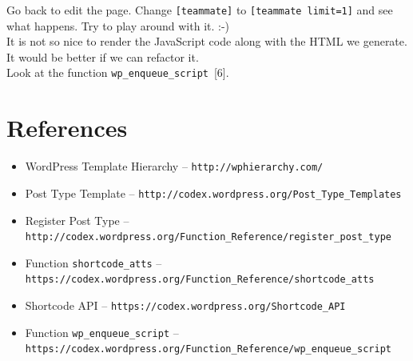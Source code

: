 \documentclass{article}
\begin{document}
\noindent Go back to edit the page. Change {\tt [teammate]} to {\tt [teammate
limit=1]} and see what happens. Try to play around with it. :-) \\

 It is not so nice to render the JavaScript code
along with the HTML we generate. It would be better if we can refactor it. \\

 Look at the function {\tt wp\_enqueue\_script}~[6].

\section*{References}

\begin{itemize}
    \item[1] WordPress Template Hierarchy -- {\tt http://wphierarchy.com/}
    \item[2] Post Type Template -- {\tt http://codex.wordpress.org/Post\_Type\_Templates}
    \item[3] Register Post Type -- {\tt http://codex.wordpress.org/Function\_Reference/register\_post\_type}
    \item[4] Function {\tt shortcode\_atts} -- {\tt https://codex.wordpress.org/Function\_Reference/shortcode\_atts}
    \item[5] Shortcode API -- {\tt https://codex.wordpress.org/Shortcode\_API}
    \item[6] Function {\tt wp\_enqueue\_script} -- {\tt https://codex.wordpress.org/Function\_Reference/wp\_enqueue\_script}
\end{itemize}
\end{document}
